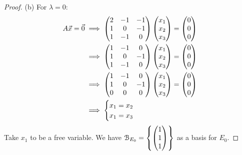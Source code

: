 \documentclass[10pt,twoside,openany]{memoir}
\begin{document}
{\begin{proof}
        (b) For $\lambda = 0$:
            \begin{equation*}
            \begin{split}
                A\vec{x} = \vec{0}
                & \implies \left( \begin{matrix} 2 & -1 & -1 \\ 1 & 0 & -1 \\ 1 & -1 & 0 \end{matrix} \right) \left( \begin{matrix} x_1 \\ x_2 \\ x_3 \end{matrix} \right) = \left( \begin{matrix} 0 \\ 0 \\ 0 \end{matrix} \right) \\
                & \implies \left( \begin{matrix} 1 & -1 & 0 \\ 1 & 0 & -1 \\ 1 & -1 & 0 \end{matrix} \right) \left( \begin{matrix} x_1 \\ x_2 \\ x_3 \end{matrix} \right) = \left( \begin{matrix} 0 \\ 0 \\ 0 \end{matrix} \right) \\ 
                & \implies \left( \begin{matrix} 1 & -1 & 0 \\ 1 & 0 & -1 \\ 0 & 0 & 0 \end{matrix} \right) \left( \begin{matrix} x_1 \\ x_2 \\ x_3 \end{matrix} \right) = \left( \begin{matrix} 0 \\ 0 \\ 0 \end{matrix} \right) \\
                & \implies \begin{cases}
                x_1 = x_2 \\
                x_1 = x_3
                \end{cases}
            \end{split}
            \end{equation*}
        Take $x_1$ to be a free variable. We have $\mathcal{B}_{E_0} = \left\{ \left( \begin{matrix} 1 \\ 1 \\ 1 \end{matrix} \right) \right\}$ as a basis for $E_0$.


\end{proof}}
\end{document}
